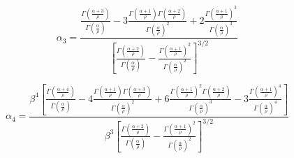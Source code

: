 \begin{frame}
    \begin{equation*}
        \alpha_3 = \frac{
                        \frac{ \Gamma \left (\frac{\alpha+3}{\rho}\right) }{ \Gamma \left (\frac{\alpha}{\rho} \right) }
                        - 3 \frac{ \Gamma \left (\frac{\alpha+1}{\rho} \right) \Gamma \left (\frac{\alpha+2}{\rho} \right) }{ \Gamma \left ( \frac{\alpha}{\rho} \right)^2 }
                        + 2 \frac{\Gamma \left (\frac{\alpha+1}{\rho} \right)^3}{\Gamma \left ( \frac{\alpha}{\rho} \right)^3}
                    }{
                        \left[ \frac{\Gamma \left (\frac{\alpha+2}{\rho} \right)}{{\Gamma \left ( \frac{\alpha}{\rho} \right)}} -
                        \frac{\Gamma \left (\frac{\alpha+1}{\rho} \right)^2}{{\Gamma \left ( \frac{\alpha}{\rho} \right)}^2} \right]^{3/2}
                    }
    \end{equation*}

    \vspace{1cm}

    \begin{equation*}
        \alpha_4 = \frac{ \beta^4 \left[
                        \frac{ \Gamma \left (\frac{\alpha+4}{\rho}\right) }{ \Gamma \left (\frac{\alpha}{\rho} \right) }
                        - 4 \frac{ \Gamma \left (\frac{\alpha+1}{\rho}\right) \Gamma \left (\frac{\alpha+3}{\rho} \right)}{ \Gamma \left (\frac{\alpha}{\rho} \right)^2 }
                        + 6 \frac{ \Gamma \left (\frac{\alpha+1}{\rho} \right)^2 \Gamma \left (\frac{\alpha+2}{\rho} \right) }{ \Gamma \left ( \frac{\alpha}{\rho} \right)^3 }
                        - 3 \frac{\Gamma \left (\frac{\alpha+1}{\rho} \right)^4}{\Gamma \left ( \frac{\alpha}{\rho} \right)^4}
                        \right]
                    }{
                        \beta^3 \left[ \frac{\Gamma \left (\frac{\alpha+2}{\rho} \right)}{{\Gamma \left ( \frac{\alpha}{\rho} \right)}} -
                        \frac{\Gamma \left (\frac{\alpha+1}{\rho} \right)^2}{{\Gamma \left ( \frac{\alpha}{\rho} \right)}^2} \right]^{3/2}
                    }
    \end{equation*}
\end{frame}

